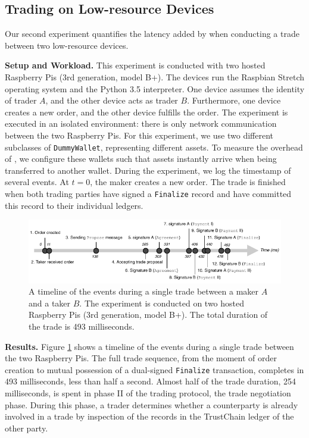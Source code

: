 \subsection{Trading on Low-resource Devices}
\label{sec:exp_trading_low_devices}
Our second experiment quantifies the latency added by \ModelName{} when conducting a trade between two low-resource devices.

\textbf{Setup and Workload.}
This experiment is conducted with two hosted Raspberry Pis (3rd generation, model B+).
The devices run the Raspbian Stretch operating system and the Python 3.5 interpreter.
One device assumes the identity of trader $ A $, and the other device acts as trader $ B $.
Furthermore, one device creates a new order, and the other device fulfills the order.
The experiment is executed in an isolated environment: there is only network communication between the two Raspberry Pis.
For this experiment, we use two different subclasses of \texttt{DummyWallet}, representing different assets.
To measure the overhead of \ModelName{}, we configure these wallets such that assets instantly arrive when being transferred to another wallet.
During the experiment, we log the timestamp of several events.
At $ t=0 $, the maker creates a new order.
The trade is finished when both trading parties have signed a \texttt{Finalize} record and have committed this record to their individual ledgers.

\begin{figure}[t]
	\centering
	\includegraphics[width=\linewidth]{xchange/assets/trade_timeline}
	\caption{A timeline of the events during a single trade between a maker $ A $ and a taker $ B $. The experiment is conducted on two hosted Raspberry Pis (3rd generation, model B+). The total duration of the trade is 493 milliseconds.}
	\label{fig:trade_timeline}
\end{figure}

\textbf{Results.}
Figure \ref{fig:trade_timeline} shows a timeline of the events during a single trade between the two Raspberry Pis.
The full trade sequence, from the moment of order creation to mutual possession of a dual-signed \texttt{Finalize} transaction, completes in 493 milliseconds, less than half a second.
Almost half of the trade duration, 254 milliseconds, is spent in phase II of the \ModelName{} trading protocol, the trade negotiation phase.
During this phase, a trader determines whether a counterparty is already involved in a trade by inspection of the records in the TrustChain ledger of the other party.

